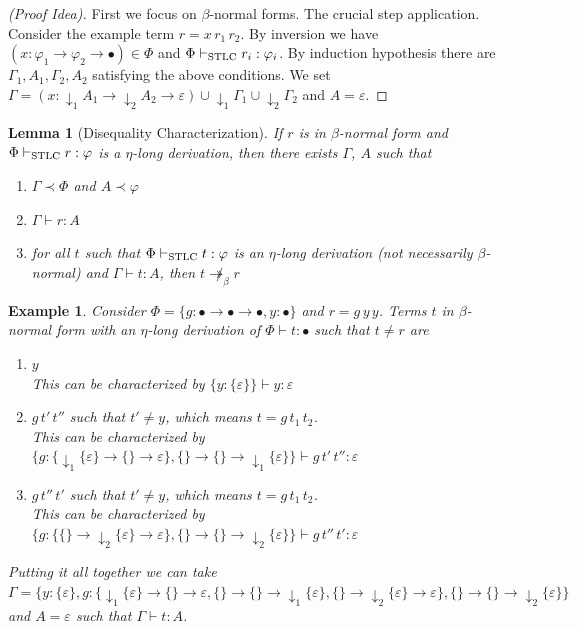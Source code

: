 \documentclass[10pt,a4paper]{article}
\theoremstyle{plain}%
\newtheorem{lemma}[theorem]{Lemma}
\newtheorem{example}[theorem]{Example}
\begin{document}
\begin{proof}[(Proof Idea)]
First we focus on $\beta$-normal forms.
The crucial step application.
Consider the example term $r = x\,r_1\,r_2$. By inversion we have $(x : \varphi_1 \to \varphi_2 \to \bullet) \in \Phi$ and $\Phi \vdash_{\textnormal{STLC}} r_i : \varphi_i$.
By induction hypothesis there are $\Gamma_1, A_1, \Gamma_2, A_2$ satisfying the above conditions.
We set $\Gamma = (x : {\downarrow_1} A_1 \to {\downarrow_2} A_2 \to \varepsilon) \cup {\downarrow_1}\Gamma_1 \cup {\downarrow_2}\Gamma_2$
and $A = \varepsilon$.
\end{proof}

\begin{lemma}[Disequality Characterization]\label{lem:neq_character}
If $r$ is in $\beta$-normal form and $\Phi \vdash_{\textnormal{STLC}} r : \varphi$ is a $\eta$-long derivation, then there exists $\Gamma$, $A$ such that
\begin{enumerate}
\item $\Gamma \prec \Phi$ and $A \prec \varphi$
\item $\Gamma \vdash r : A$
\item for all $t$ such that $\Phi \vdash_{\textnormal{STLC}} t : \varphi$ is an $\eta$-long derivation (not necessarily $\beta$-normal) and $\Gamma \vdash t : A$, then $t \not\twoheadrightarrow_\beta r$
\end{enumerate}
\end{lemma}

\begin{example}
Consider $\Phi = \{g : \bullet \to \bullet \to \bullet, y : \bullet\}$ and $r = g\,y\,y$.
Terms $t$ in $\beta$-normal form with an $\eta$-long derivation of $\Phi \vdash t : \bullet$ such that $t \neq r$ are
\begin{enumerate}
\item $y$\\
This can be characterized by $\{y : \{\varepsilon\}\} \vdash y : \varepsilon$
\item $g\,t'\,t''$ such that $t' \neq y$, which means $t = g\,t_1\,t_2$.\\
This can be characterized by $\{g : \{{\downarrow_1}\{\varepsilon\} \to \{\} \to \varepsilon\}, \{\} \to \{\} \to {\downarrow_1}\{\varepsilon\} \} \vdash g\,t'\,t'' : \varepsilon$
\item $g\,t''\,t'$ such that $t' \neq y$, which means $t = g\,t_1\,t_2$.\\
This can be characterized by $\{g : \{\{\} \to {\downarrow_2}\{\varepsilon\} \to \varepsilon\}, \{\} \to \{\} \to {\downarrow_2}\{\varepsilon\} \} \vdash g\,t''\,t' : \varepsilon$
\end{enumerate}
Putting it all together we can take $\Gamma = \{y : \{\varepsilon\}, g : \{{\downarrow_1}\{\varepsilon\} \to \{\} \to \varepsilon, \{\} \to \{\} \to {\downarrow_1}\{\varepsilon\}, \{\} \to {\downarrow_2}\{\varepsilon\} \to \varepsilon\}, \{\} \to \{\} \to {\downarrow_2}\{\varepsilon\}\}$ and $A = \varepsilon$ such that $\Gamma \vdash t : A$.
\end{example}
\end{document}
